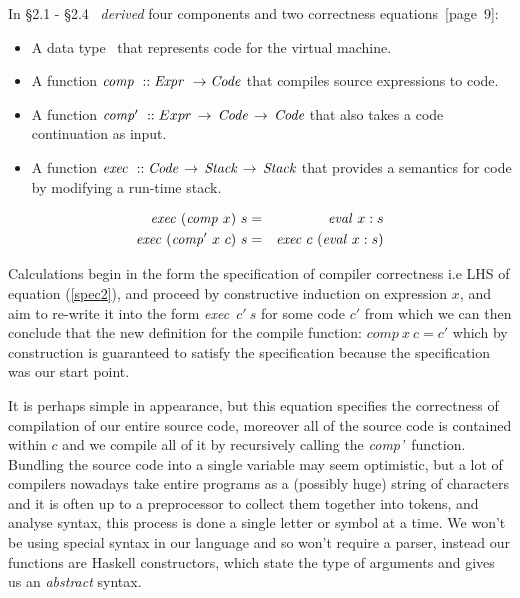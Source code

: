 \documentclass {article}
\begin{document}
In \S2.1 - \S2.4 \BH\
\emph{derived} four 
components and two correctness equations\cite{bandh}~[page~9]:
\newcommand{\exec}{\textit{exec}}
\newcommand{\comp }{\textit{comp}}
\newcommand{\compp}{\textit{comp'}}
\newcommand{\Exec}{\mathit{exec\ }}
\newcommand{\Comp}{\mathit{comp\ }}
\newcommand{\Compp}{\mathit{comp'\  }}
\begin{itemize}
\item A data type \code\ that represents
	code for the virtual machine.
\item A function \( \Comp :: \Expr \rightarrow \code \)
	that compiles source expressions to code.
\item A function 
	\( \Compp::Expr \, \rightarrow \, \code \, \rightarrow \, \code \)
	that also takes a code continuation as input.
\item A function
	\( \Exec :: \code \, \rightarrow \, \textit{Stack} \, \rightarrow \, \textit{Stack} \)
	that provides a semantics for code by modifying a run-time stack.
\end{itemize}
\begin{eqnarray}
\Exec  (\Comp   x)\  s &=& \evalf x:s \label{spec1}\\
\Exec  (\Compp  x\  c)\ s &=& \Exec  c\  (\evalf x:s) \label{spec2}
\end{eqnarray}

Calculations begin in the form the 
specification of compiler correctness i.e LHS of equation (\ref{spec2}),
and proceed by constructive induction on expression $x$, 
and aim to re-write it into the form
\exec\  $c'\  s$ for some code $c'$
from which we can then conclude that the new definition
for the compile function: \( \Comp  x\  c = c' \) 
which by construction is guaranteed to satisfy
 the specification because 
the specification was our start point.

It is perhaps simple in appearance,
but this equation
specifies the correctness of compilation of our entire source code,
moreover all of the source code is contained within  $c$
and we compile all of it by recursively calling the \compp\ function.
Bundling the source code into a 
single variable may seem optimistic, but a lot of compilers nowadays 
take entire programs as a (possibly huge) string of characters
and it is often up to a preprocessor to collect 
them together into tokens, and analyse syntax, 
this process is done a single letter or symbol at a time\cite{dragon}.
We won't be using special syntax in our language and so won't
require a parser, instead our functions are  Haskell constructors, 
which state the type of arguments and gives us an \emph{abstract} syntax.
\end{document}
